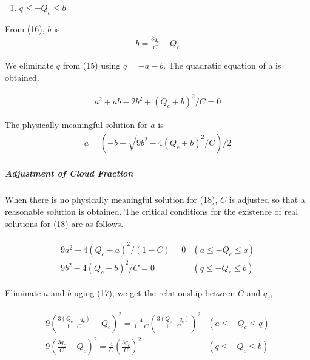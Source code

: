 \begin{enumerate}
\def\labelenumi{\arabic{enumi}.}
\setcounter{enumi}{1}
\tightlist
\item
  \(q \leq-Q_{c} \leq b\)
\end{enumerate}

From (16), \(b\) is \begin{eqnarray}
b=\frac{3 q_{c}}{C}-Q_{c}
\end{eqnarray}

We eliminate \(q\) from (15) using \(q = -a-b\). The quadratic equation
of a is obtained.

\begin{eqnarray}
a^{2}+ab-2 b^{2}+\left(Q_{c}+b\right)^{2} / C=0
\label{E08-17}
\end{eqnarray}

The physically meaningful solution for \(a\) is \begin{eqnarray}
a=\left(-b-\sqrt{9 b^{2}-4\left(Q_{c}+b\right)^{2} / C}\right) / 2
\label{E08-18}
\end{eqnarray}

\hypertarget{adjustment-of-cloud-fraction}{%
\subparagraph{Adjustment of Cloud
Fraction}\label{adjustment-of-cloud-fraction}}

When there is no physically meaningful solution for (18), \(C\) is
adjusted so that a reasonable solution is obtained. The critical
conditions for the existence of real solutions for (18) are as follows.

\begin{eqnarray}
\begin{array}{ll}
9 a^{2}-4\left(Q_{c}+a\right)^{2} /(1-C)=0 & \left(a \leq-Q_{c} \leq q\right) \\
9 b^{2}-4\left(Q_{c}+b\right)^{2} / C=0 & \left(q \leq-Q_{c} \leq b\right)
\end{array}
\end{eqnarray}

Eliminate \(a\) and \(b\) uging (17), we get the relationship between
\(C\) and \(q_c\),

\begin{eqnarray}
\begin{array}{ll}
9\left(\frac{3\left(Q_{c}-q_{c}\right)}{1-C}-Q_{c}\right)^{2}=\frac{4}{1-C}\left(\frac{3\left(Q_{c}-q_{c}\right)}{1-C}\right)^{2} & \left(a \leq-Q_{c} \leq q\right) \\
9\left(\frac{3 q_{c}}{C}-Q_{c}\right)^{2}=\frac{4}{C}\left(\frac{3 q_{c}}{C}\right)^{2} & \left(q \leq-Q_{c} \leq b\right)
\end{array}
\end{eqnarray}

